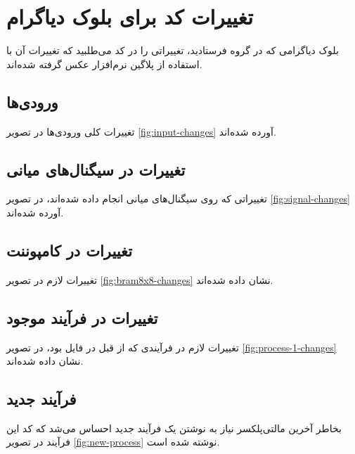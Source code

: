 \documentclass[dvipsnames, svgnames, x11names, a4paper, 11pt]{article}
\begin{document}
\section{تغییرات کد برای بلوک دیاگرام}
بلوک دیاگرامی که در گروه فرستادید، تغییراتی را در کد 
می‌طلبید که تغییرات آن با استفاده از پلاگین  نرم‌افزار 
عکس گرفته شده‌اند.

\subsection{ورودی‌ها}
تغییرات کلی ورودی‌‌‌ها در تصویر 
\ref{fig:input-changes}
آورده شده‌اند.

\subsection{تغییرات در سیگنال‌های میانی}
تغییراتی که روی سیگنا‌ل‌های میانی انجام داده شده‌اند، در تصویر
\ref{fig:signal-changes}
آورده شده‌اند.

\subsection{تغییرات در کامپوننت }
تغییرات لازم در تصویر 
\ref{fig:bram8x8-changes}
نشان داده شده‌اند.

\subsection{تغییرات در فرآیند موجود}
تغییرات لازم در فرآیندی که از قبل در فایل بود، در تصویر
\ref{fig:process-1-changes}
نشان داده‌ شده‌اند.

\subsection{فرآیند جدید}
بخاطر آخرین مالتی‌پلکسر نیاز به نوشتن یک فرآیند جدید احساس می‌شد که کد این فرآیند در تصویر 
\ref{fig:new-process}
نوشته شده است.
\end{document}

